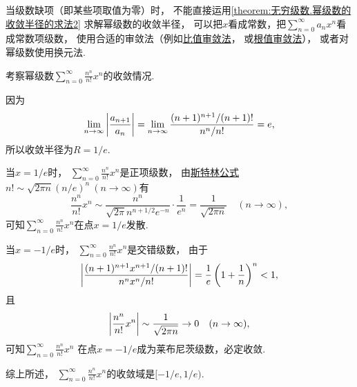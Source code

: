\begin{remark}
当级数缺项（即某些项取值为零）时，
不能直接运用\cref{theorem:无穷级数.幂级数的收敛半径的求法2} 求解幂级数的收敛半径，
可以把\(x\)看成常数，把\(\sum_{n=0}^\infty a_n x^n\)看成常数项级数，
使用合适的审敛法（例如\hyperref[theorem:无穷级数.正项级数的比值审敛法]{比值审敛法}，
或\hyperref[theorem:无穷级数.正项级数的根值审敛法]{根值审敛法}），
或者对幂级数使用换元法.
\end{remark}

\begin{example}
考察幂级数\(\sum_{n=0}^\infty \frac{n^n}{n!} x^n\)的收敛情况.
\begin{solution}
因为\begin{equation*}
	\lim_{n\to\infty} \abs{\frac{a_{n+1}}{a_n}}
	= \lim_{n\to\infty} \frac{(n+1)^{n+1} / (n+1)!}{n^n / n!}
	= e,
\end{equation*}
所以收敛半径为\(R=1/e\).

当\(x=1/e\)时，
\(\sum_{n=0}^\infty \frac{n^n}{n!} x^n\)是正项级数，
由\hyperref[example:无穷乘积.斯特林公式]{斯特林公式}
\(n! \sim \sqrt{2\pi n} (n/e)^n\ (n\to\infty)\)有\begin{equation*}
	\frac{n^n}{n!} x^n
	\sim
	\frac{n^n}{\sqrt{2\pi} n^{n+1/2} e^{-n}} \cdot \frac1{e^n}
	= \frac1{\sqrt{2\pi n}}
	\quad(n\to\infty),
\end{equation*}
可知\(\sum_{n=0}^\infty \frac{n^n}{n!} x^n\)在点\(x=1/e\)发散.

当\(x=-1/e\)时，
\(\sum_{n=0}^\infty \frac{n^n}{n!} x^n\)是交错级数，
由于\begin{equation*}
	\abs{\frac{(n+1)^{n+1} x^{n+1} / (n+1)!}{n^n x^n / n!}}
	= \frac1e \left( 1 + \frac1n \right)^n
	< 1,
\end{equation*}
且\begin{equation*}
	\abs{\frac{n^n}{n!} x^n}
	\sim
	\frac1{\sqrt{2\pi n}}
	\to 0
	\quad(n\to\infty),
\end{equation*}
可知\(\sum_{n=0}^\infty \frac{n^n}{n!} x^n\)
在点\(x=-1/e\)成为莱布尼茨级数，必定收敛.

综上所述，
\(\sum_{n=0}^\infty \frac{n^n}{n!} x^n\)的收敛域是\([-1/e,1/e)\).
\end{solution}
\end{example}


